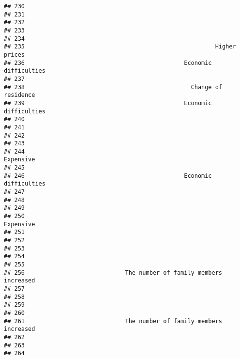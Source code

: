 \documentclass[
]{article}
\begin{document}
\begin{verbatim}
## 230                                                                    
## 231                                                                    
## 232                                                                    
## 233                                                                    
## 234                                                                    
## 235                                                       Higher prices
## 236                                              Economic difficulties 
## 237                                                                    
## 238                                                Change of residence 
## 239                                              Economic difficulties 
## 240                                                                    
## 241                                                                    
## 242                                                                    
## 243                                                                    
## 244                                                          Expensive 
## 245                                                                    
## 246                                              Economic difficulties 
## 247                                                                    
## 248                                                                    
## 249                                                                    
## 250                                                          Expensive 
## 251                                                                    
## 252                                                                    
## 253                                                                    
## 254                                                                    
## 255                                                                    
## 256                             The number of family members increased 
## 257                                                                    
## 258                                                                    
## 259                                                                    
## 260                                                                    
## 261                             The number of family members increased 
## 262                                                                    
## 263                                                                    
## 264                                                                    

\end{verbatim}
\end{document}
